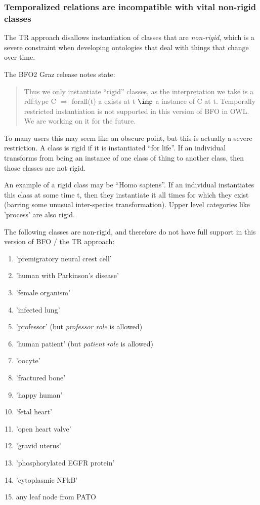 \documentclass{bioinfo}
\begin{document}
\subsubsection{Temporalized relations are incompatible with vital
  non-rigid classes}

The TR approach disallows instantiation of classes that are
\emph{non-rigid}, which is a severe constraint when developing
ontologies that deal with things that change over time.

The BFO2 Graz release notes\cite{Graz} state:

\begin{quotation}

  Thus we only instantiate ``rigid'' classes, as the interpretation we
  take is a rdf:type C $\Rightarrow$ forall(t) a exists at t $\imp$ a
  instance of C at t. Temporally restricted instantiation is not
  supported in this version of BFO in OWL. We are working on it for
  the future.

\end{quotation}

To many users this may seem like an obscure point, but this is
actually a severe restriction. A class is rigid if it is instantiated
``for life''. If an individual transforms from being an instance of
one class of thing to another class, then those classes are not rigid.

An example of a rigid class may be ``Homo sapiens''. If an individual
instantiates this class at some time t, then they instantiate it all
times for which they exist (barring some unusual inter-species
transformation). Upper level categories like 'process' are also rigid.

The following classes are non-rigid, and therefore do not have full
support in this version of BFO / the TR approach:

\begin{enumerate}

  \item 'premigratory neural crest cell'
  \item 'human with Parkinson's disease'
  \item 'female organism'
  \item 'infected lung'
  \item 'professor' (but \emph{professor role} is allowed)
  \item 'human patient' (but \emph{patient role} is allowed)
  \item 'oocyte'
  \item 'fractured bone'
  \item 'happy human'
  \item 'fetal heart'
  \item 'open heart valve'
  \item 'gravid uterus'
  \item 'phosphorylated EGFR protein'
  \item 'cytoplasmic NFkB'
  \item any leaf node from PATO

\end{enumerate}
\end{document}
